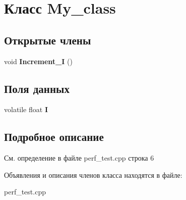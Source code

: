 \hypertarget{class_my__class}{\section{Класс \-My\-\_\-class}
\label{class_my__class}
}
\subsection*{Открытые члены}
\begin{DoxyCompactItemize}
\item 
\hypertarget{class_my__class_a46797d09f0df1bc7622537900c1277c1}{void {\bfseries \-Increment\-\_\-\-I} ()}\label{class_my__class_a46797d09f0df1bc7622537900c1277c1}

\end{DoxyCompactItemize}
\subsection*{Поля данных}
\begin{DoxyCompactItemize}
\item 
\hypertarget{class_my__class_a8ea34b2e963fe95ccac1975beb7fff6a}{volatile float {\bfseries \-I}}\label{class_my__class_a8ea34b2e963fe95ccac1975beb7fff6a}

\end{DoxyCompactItemize}


\subsection{Подробное описание}


См. определение в файле perf\-\_\-test.\-cpp строка 6



Объявления и описания членов класса находятся в файле\-:\begin{DoxyCompactItemize}
\item 
perf\-\_\-test.\-cpp\end{DoxyCompactItemize}
